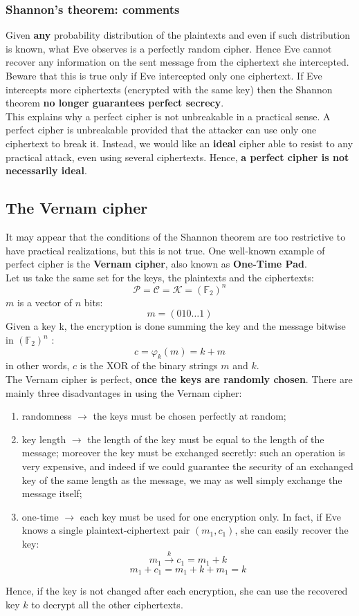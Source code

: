 \documentclass[a4paper, 10pt, titlepage]{article}
\begin{document}
\subsubsection{Shannon’s theorem: comments}
Given \textbf{any} probability distribution of the plaintexts and even if such distribution is known, what Eve observes is a perfectly random cipher. Hence Eve cannot recover any information on the sent message from the ciphertext she intercepted. 
Beware that this is true only if Eve intercepted only one ciphertext.
If Eve intercepts more ciphertexts (encrypted with the same key) then the Shannon theorem \textbf{no longer guarantees perfect secrecy}. \\
This explains why a perfect cipher is not unbreakable in a practical sense. A perfect cipher is unbreakable provided that the attacker can use only one ciphertext to break it. Instead, we would like an \textbf{ideal} cipher able to resist to any practical attack, even using several ciphertexts. Hence, \textbf{a perfect cipher is not necessarily ideal}.

\subsection{The Vernam cipher}
It may appear that the conditions of the Shannon theorem are too restrictive to have practical realizations, but this is not true. One well-known example of perfect cipher is the \textbf{Vernam cipher}, also known as \textbf{One-Time Pad}. \\
Let us take the same set for the keys, the plaintexts and the ciphertexts:
$$\mathcal{P} = \mathcal{C} = \mathcal{K} = (\mathbb{F}_2)^n$$
$m$ is a vector of $n$ bits:
$$m = (010 \dots 1)$$
Given a key k, the encryption is done summing the key and the message
bitwise in $(\mathbb{F}_2)^n$ :
$$c = \varphi_k (m) = k + m$$
in other words, $c$ is the XOR of the binary strings $m$ and $k$. \\
The Vernam cipher is perfect, \textbf{once the keys are randomly chosen}. There are mainly three disadvantages in using the Vernam cipher:
\begin{enumerate}
\item randomness $\rightarrow$ the keys must be chosen perfectly at random;
\item key length $\rightarrow$ the length of the key must be equal to the length of the message; moreover the key must be exchanged secretly: such an operation is very expensive, and indeed if we could guarantee the security of an exchanged key of the same length as the message, we may as well simply exchange the message itself;
\item one-time $\rightarrow$ each key must be used for one encryption only. In fact, if Eve knows a single plaintext-ciphertext pair $(m_1 , c_1)$, she can easily recover the key:
$$m_1 \overset{k} \longrightarrow c_1 = m_1 + k$$
$$m_1 + c_1 = m_1 + k + m_1 = k$$
\end{enumerate}
Hence, if the key is not changed after each encryption, she can use the recovered key $k$ to decrypt all the other ciphertexts.
\end{document}
